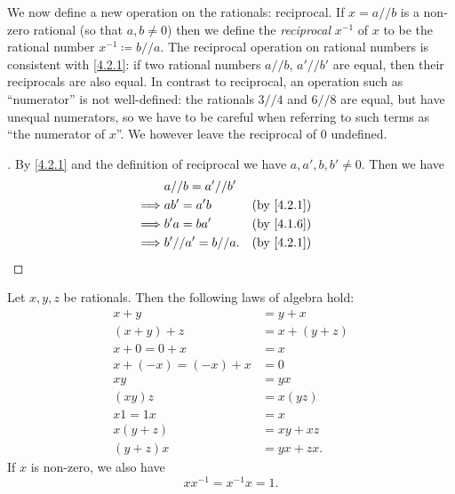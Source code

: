 \begin{ac}\label{ac:4.2.3}
  We now define a new operation on the rationals: reciprocal.
  If \(x = a // b\) is a non-zero rational (so that \(a, b \neq 0\)) then we define the \emph{reciprocal} \(x^{-1}\) of \(x\) to be the rational number \(x^{-1} \coloneqq b // a\).
  The reciprocal operation on rational numbers is consistent with \cref{4.2.1}:
  if two rational numbers \(a // b\), \(a' // b'\) are equal, then their reciprocals are also equal.
  In contrast to reciprocal, an operation such as ``numerator'' is not well-defined:
  the rationals \(3 // 4\) and \(6 // 8\) are equal, but have unequal numerators, so we have to be careful when referring to such terms as ``the numerator of \(x\)''.
  We however leave the reciprocal of \(0\) undefined.
\end{ac}

\begin{proof}[]
  By \cref{4.2.1} and the definition of reciprocal we have \(a, a', b, b' \neq 0\).
  Then we have
  \begin{align*}
             & a // b = a' // b'                  \\
    \implies & ab' = a'b          &  & \by{4.2.1} \\
    \implies & b'a = ba'          &  & \by{4.1.6} \\
    \implies & b' // a' = b // a. &  & \by{4.2.1}
  \end{align*}
\end{proof}

\begin{prop}\label{4.2.4}
  Let \(x, y, z\) be rationals.
  Then the following laws of algebra hold:
  \begin{align*}
    x + y               & = y + x       \\
    (x + y) + z         & = x + (y + z) \\
    x + 0 = 0 + x       & = x           \\
    x + (-x) = (-x) + x & = 0           \\
    xy                  & = yx          \\
    (xy)z               & = x(yz)       \\
    x1 = 1x             & = x           \\
    x(y + z)            & = xy + xz     \\
    (y + z)x            & = yx + zx.
  \end{align*}
  If \(x\) is non-zero, we also have
  \[
    xx^{-1} = x^{-1}x = 1.
  \]
\end{prop}

